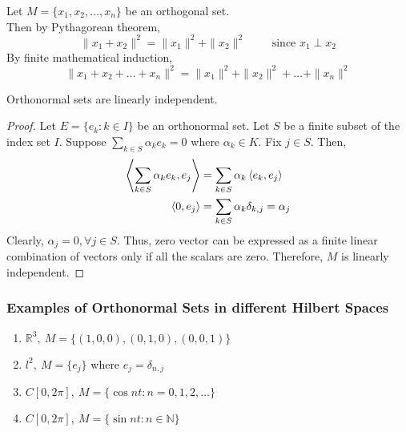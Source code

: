 \begin{remark}
	Let $M = \{ x_1,x_2,\dots,x_n\}$ be an orthogonal set.\\
	Then by Pythagorean theorem,
	\[ \|x_1 + x_2\|^2 = \|x_1\|^2 + \|x_2\|^2 \qquad \text{ since } x_1 \perp x_2 \]
	By finite mathematical induction,
	\[ \|x_1 + x_2 + \dots + x_n\|^2 = \|x_1\|^2 + \|x_2\|^2 + \dots + \|x_n\|^2 \]
\end{remark}

\begin{lemma}
	Orthonormal sets are linearly independent.
\end{lemma}
\begin{proof}
	Let $E = \{e_k : k \in I\}$ be an orthonormal set.
	Let $S$ be a finite subset of the index set $I$.
	Suppose $\displaystyle \sum_{k \in S} \alpha_k e_k = 0$ where $\alpha_k \in K$.
	Fix $j \in S$.
	Then,
	\begin{align*}
		\left\langle \sum_{k \in S} \alpha_k e_k,e_j \right\rangle 
		& = \sum_{k \in S} \alpha_k \left\langle e_k,e_j \right\rangle \\
		\left\langle 0,e_j \right\rangle & = \sum_{k \in S} \alpha_k \delta_{k,j} = \alpha_j
	\end{align*}
	Clearly, $\alpha_j = 0, \forall j \in S$.
	Thus, zero vector can be expressed as a finite linear combination of vectors only if all the scalars are zero.
	Therefore, $M$ is linearly independent.
\end{proof}

\subsubsection{Examples of Orthonormal Sets in different Hilbert Spaces}
\begin{enumerate}
	\item $\mathbb{R}^3,\ M = \{(1,0,0),(0,1,0),(0,0,1)\}$
	\item $l^2,\ M = \{e_j\}$ where $e_j =\delta_{n,j}$
	\item $C[0,2\pi],\ M = \{ \cos nt : n =0,1,2,\dots \}$
	\item $C[0,2\pi],\ M = \{ \sin nt : n \in \mathbb{N} \}$
\end{enumerate}


